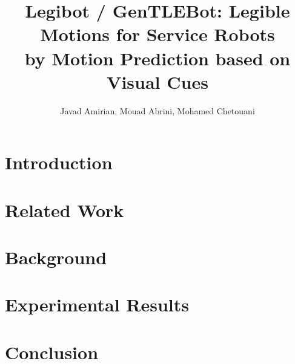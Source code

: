 \documentclass[letterpaper, 10pt, conference]{article}
\begin{document}
\title{Legibot / GenTLEBot: Legible Motions for Service Robots \\ \large by Motion Prediction based on Visual Cues}
\author{Javad Amirian, Mouad Abrini, Mohamed Chetouani}
\maketitle

\begin{abstract}

\end{abstract}



\section{Introduction}



%

\section{Related Work}


\section{Background}




%
%

\section{Experimental Results}


\section{Conclusion}




%


\end{document}
